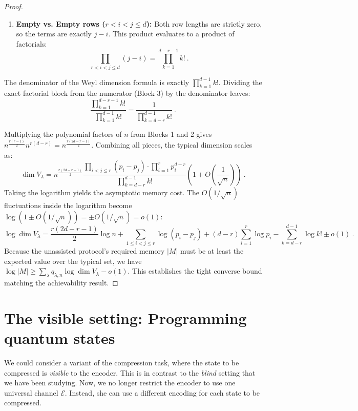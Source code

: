 \documentclass[11pt,letterpaper]{article}
\def\E{\mathcal{E}}
\begin{document}
\begin{proof}
\begin{enumerate}
    \item \textbf{Empty vs. Empty rows ($r < i < j \le d$):}
    Both row lengths are strictly zero, so the terms are exactly $j - i$. This product evaluates to a product of factorials:
    \begin{equation}
        \prod_{r < i < j \le d} (j - i) = \prod_{k=1}^{d-r-1} k! \ .
    \end{equation}
\end{enumerate}

The denominator of the Weyl dimension formula is exactly $\prod_{k=1}^{d-1} k!$. Dividing the exact factorial block from the numerator (Block 3) by the denominator leaves:
\begin{equation}
    \frac{\prod_{k=1}^{d-r-1} k!}{\prod_{k=1}^{d-1} k!} = \frac{1}{\prod_{k=d-r}^{d-1} k!} \ .
\end{equation}

Multiplying the polynomial factors of $n$ from Blocks 1 and 2 gives $n^{\frac{r(r-1)}{2}} n^{r(d-r)} = n^{\frac{r(2d-r-1)}{2}}$. Combining all pieces, the typical dimension scales as:
\begin{equation}
    \dim V_\lambda = n^{\frac{r(2d-r-1)}{2}} \frac{\prod_{i < j \le r}(p_i - p_j) \cdot \prod_{i=1}^r p_i^{d-r}}{\prod_{k=d-r}^{d-1} k!} \left( 1 + O\left(\frac{1}{\sqrt{n}}\right) \right) \ .
\end{equation}
Taking the logarithm yields the asymptotic memory cost. The $O(1/\sqrt{n})$ fluctuations inside the logarithm become $\log(1 \pm O(1/\sqrt{n})) = \pm O(1/\sqrt{n}) = o(1)$:
\begin{equation}
    \log \dim V_\lambda = \frac{r(2d-r-1)}{2}\log n + \sum_{1 \le i < j \le r}\log(p_i-p_j) + (d-r)\sum_{i=1}^r \log p_i - \sum_{k=d-r}^{d-1}\log k! \pm o(1) \ .
\end{equation}
Because the unassisted protocol's required memory $|M|$ must be at least the expected value over the typical set, we have $\log|M| \ge \sum_\lambda q_{\lambda,n} \log \dim V_\lambda - o(1)$. This establishes the tight converse bound matching the achievability result.
\end{proof}

\section{The visible setting: Programming quantum states}
We could consider a variant of the compression task, where the state to be compressed is \emph{visible} to the encoder. This is in contrast to the \emph{blind} setting that we have been studying. Now, we no longer restrict the encoder to use one universal channel $\E$. Instead, she can use a different encoding for each state to be compressed. 
\end{document}
